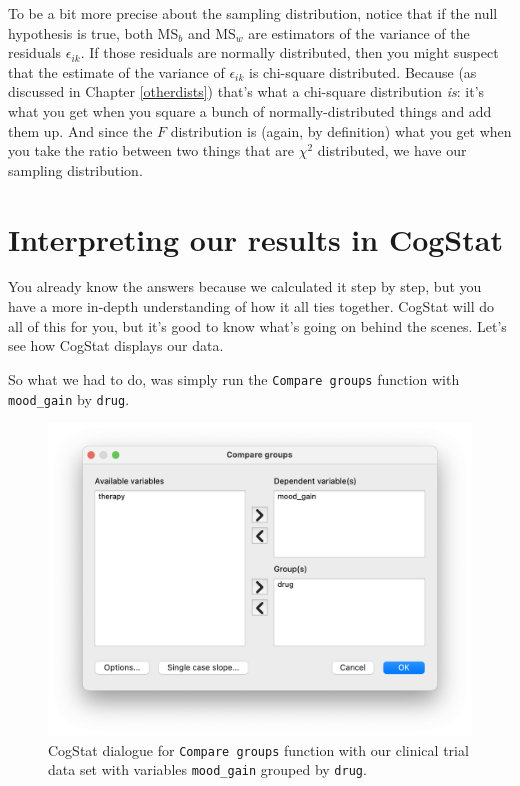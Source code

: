 \documentclass[
  11pt,
  a4paper,
  twoside,symmetric,openright]{book}
\theoremstyle{break}
\theoremstyle{break}
\begin{document}
To be a bit more precise about the sampling distribution, notice that if the null hypothesis is true, both MS\(_b\) and MS\(_w\) are estimators of the variance of the residuals \(\epsilon_{ik}\). If those residuals are normally distributed, then you might suspect that the estimate of the variance of \(\epsilon_{ik}\) is chi-square distributed. Because (as discussed in Chapter \ref{otherdists}) that's what a chi-square distribution \emph{is}: it's what you get when you square a bunch of normally-distributed things and add them up. And since the \(F\) distribution is (again, by definition) what you get when you take the ratio between two things that are \(\chi^2\) distributed, we have our sampling distribution.

\section{Interpreting our results in CogStat}\label{introduceaov}

You already know the answers because we calculated it step by step, but you have a more in-depth understanding of how it all ties together. CogStat will do all of this for you, but it's good to know what's going on behind the scenes. Let's see how CogStat displays our data.

So what we had to do, was simply run the \texttt{Compare\ groups} function with \texttt{mood\_gain} by \texttt{drug}.



\begin{figure}

{\centering \includegraphics[width=0.6\linewidth]{resources/image/comparegroupsbydrug} 

}

\caption{CogStat dialogue for \texttt{Compare\ groups} function with our clinical trial data set with variables \texttt{mood\_gain} grouped by \texttt{drug}.}\label{fig:cogcompbydrugdialog}
\end{figure}
\end{document}
